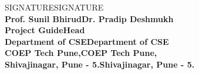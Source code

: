 \begin{center}		%

SIGNATURESIGNATURE\\
\normalsize{\bf{Prof. Sunil BhirudDr. Pradip Deshmukh\\
Project GuideHead}\\
Department of CSEDepartment of CSE\\
COEP Tech Pune,COEP Tech Pune,\\
Shivajinagar, Pune - 5.Shivajinagar, Pune - 5.}
\end{center}

